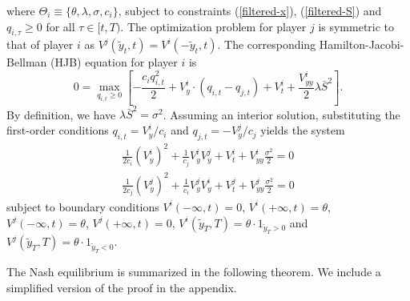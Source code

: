 \documentclass[mnsc]{informs3}
\begin{document}
where $\Theta_i \equiv\{\theta, \lambda, \sigma, c_i\}$, subject to constraints (\ref{filtered-x}), (\ref{filtered-S}) and $q_{i,\tau}\ge0$ for all $\tau\in[t,T)$.
The optimization problem for player $j$ is symmetric to that of player $i$ as $V^j(\tilde{y}_t, t) = V^i(-\tilde{y}_t, t)$.
The corresponding Hamilton-Jacobi-Bellman (HJB) equation for player $i$ is
\begin{equation*}
0 = \max_{q_{i,t}\ge0}\left[-\frac{c_iq_{i,t}^2}{2} + V^i_{y}\cdot\left(q_{i,t}-q_{j,t}\right)+V^i_t + \frac{V^i_{yy}}{2}\lambda \bar{S}^2\right].
\end{equation*}
By definition, we have $\lambda \bar{S}^2 = \sigma^2$.
Assuming an interior solution, substituting the first-order conditions $q_{i,t} = V^i_y/c_i$ and $q_{j,t} = -V^j_y/c_j$ yields the system
\begin{equation*}
\begin{aligned}
\frac{1}{2c_i}(V^i_y)^2 + \frac{1}{c_j}V^i_yV^j_y + V^i_t + V^i_{yy}\frac{\sigma^2}{2} = 0\\
\frac{1}{2c_j}(V^j_y)^2 + \frac{1}{c_i}V^j_yV^i_y + V^j_t + V^j_{yy}\frac{\sigma^2}{2} = 0
\end{aligned}
\end{equation*}
subject to boundary conditions $V^i(-\infty, t) = 0$, $V^i(+\infty, t) = \theta$, $V^j(-\infty, t) = \theta$, $V^j(+\infty, t)=0$, $V^i(\tilde{y}_T, T) = \theta \cdot 1_{\tilde{y}_T > 0}$ and $V^j(\tilde{y}_T, T) = \theta \cdot 1_{\tilde{y}_T < 0}$.


The Nash equilibrium is summarized in the following theorem.
We include a simplified version of the proof in the appendix.
\end{document}
